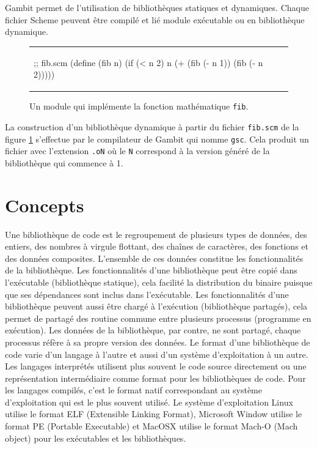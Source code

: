 Gambit permet de l'utilisation de bibliothèques statiques et dynamiques.
Chaque fichier Scheme peuvent être compilé et lié module exécutable ou
en bibliothèque dynamique.

\begin{center}
\begin{figure}[ht]
  \begin{tabular}{l}
    \begin{mplisting}{0.5}
;; fib.scm
(define (fib n)
  (if (< n 2)
      n
      (+ (fib (- n 1))
         (fib (- n 2)))))
\end{mplisting}
  \end{tabular}
  \caption{Un module qui implémente la fonction mathématique \texttt{fib}.}
  \label{fig:basic_fib_module}
\end{figure}
\end{center}

\vspace{-20pt}
La construction d'un bibliothèque dynamique à partir du fichier \texttt{fib.scm}
de la figure \ref{fig:basic_fib_module} s'effectue par le compilateur de Gambit
qui nomme \texttt{gsc}. Cela produit un fichier avec l'extension \texttt{.oN}
où le \texttt{N} correspond à la version généré de la bibliothèque qui commence à 1.


\section{Concepts}

Une bibliothèque de code est le regroupement de plusieurs types
de données, des entiers, des nombres à virgule flottant, des chaînes
de caractères, des fonctions et des données composites. L'ensemble
de ces données constitue les fonctionnalités de la bibliothèque.
Les fonctionnalités d'une bibliothèque peut être copié dans l'exécutable
(bibliothèque statique), cela facilité la distribution du binaire puisque
que ses dépendances sont inclus dans l'exécutable.
Les fonctionnalités d'une bibliothèque peuvent aussi être chargé
à l'exécution (bibliothèque partagés), cela permet de partagé des routine
commune entre plusieurs processus (programme en exécution). Les données de
la bibliothèque, par contre, ne sont partagé, chaque processus réfère à
sa propre version des données.
Le format d'une bibliothèque de code varie d'un langage à l'autre et aussi d'un
système d'exploitation à un autre. Les langages interprétés utilisent plus
souvent le code source directement ou une représentation intermédiaire comme format pour
les bibliothèques de code.
Pour les langages compilés, c'est le format natif correspondant au système d'exploitation
qui est le plus souvent utilisé. Le système d'exploitation Linux utilise le
format ELF (Extensible Linking Format), Microsoft Window utilise le format PE (Portable Executable)
et MacOSX utilise le format Mach-O (Mach object) pour les exécutables et les bibliothèques.

